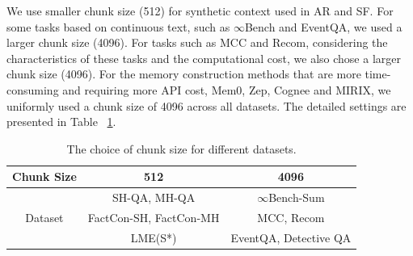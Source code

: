 We use smaller chunk size (512) for synthetic context used in AR and SF. For some tasks based on continuous text, such as $\infty$Bench and EventQA, we used a larger chunk size (4096). For tasks such as MCC and Recom, considering the characteristics of these tasks and the computational cost, we also chose a larger chunk size (4096). For the memory construction methods that are more time-consuming and requiring more API cost, Mem0, Zep, Cognee and MIRIX, we uniformly used a chunk size of 4096 across all datasets. The detailed settings are presented in Table ~\ref{tab:different_context_length_setting}.



\begin{table}
    \centering
    \caption{Maximum output token limits for various tasks}
    \label{tab:token_limits}
    \centering
    \vspace{10pt}
    \caption{The choice of chunk size for different datasets.} 
    \begin{tabular}{c|cc}
        \toprule
          \textbf{Chunk Size}  & 512 & 4096 \\
          \midrule
          & SH-QA, MH-QA  & $\infty$Bench-Sum \\
          Dataset      & FactCon-SH, FactCon-MH & MCC, Recom \\  
          & LME(S*) & EventQA, Detective QA   \\
          \bottomrule
        \end{tabular}

    \label{tab:different_context_length_setting}
\end{table}





